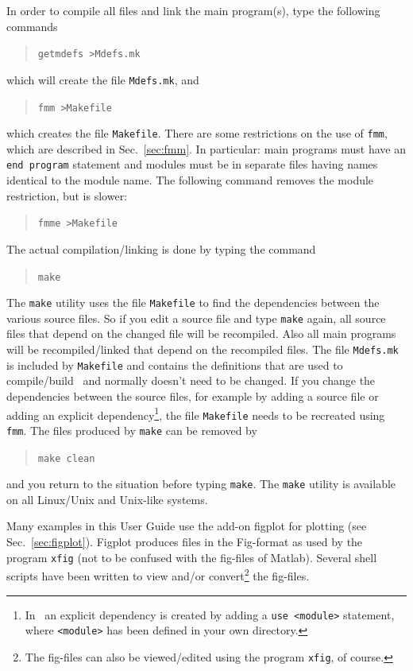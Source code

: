 In order to compile all files and link the main program(s), type the following
commands
\begin{quote}
   \texttt{getmdefs >Mdefs.mk}
\end{quote}
which will create the file \texttt{Mdefs.mk}, and
\begin{quote}
   \texttt{fmm >Makefile}
\end{quote}
which creates the file \texttt{Makefile}.
There are some restrictions on the use of
\texttt{fmm}, which are described in Sec.~\ref{sec:fmm}. In particular: main
programs must have an \texttt{end program} statement and modules
must be in separate files having names identical to the module name. The
following command removes the module restriction, but is slower:
\begin{quote}
   \texttt{fmme >Makefile}
\end{quote}
The actual compilation/linking is done by typing the command
\begin{quote}
   \texttt{make}
\end{quote}
The \texttt{make} utility uses the file \texttt{Makefile} to find the
dependencies between the various source files. So if you edit a source file 
and type \texttt{make} again, 
all source files that depend on the changed file
will be recompiled. Also all main programs
will be recompiled/linked that depend on the recompiled files. The file
\texttt{Mdefs.mk} is included by \texttt{Makefile} and
contains the definitions that are used to compile/build \tfem\ and normally
doesn't need to be changed. If you change the dependencies between the source
files, for example by adding a source file or adding an explicit
dependency\footnote{In \ftn\ an explicit dependency is created by 
adding a \texttt{use <module>} statement, where
\texttt{<module>} has been defined in your own directory.}, the
file \texttt{Makefile} needs to be recreated using \texttt{fmm}.
The files produced by \texttt{make} can be removed by
\begin{quote}
   \texttt{make clean}
\end{quote}
and you return to the situation before typing \texttt{make}.
The \texttt{make} utility is available on all Linux/Unix and Unix-like systems.

Many examples in this User Guide use the add-on figplot for plotting (see
Sec.~\ref{sec:figplot}). Figplot produces files in the Fig-format as
used by the program \texttt{xfig} (not to be confused with the fig-files of
Matlab). Several shell scripts have been written to view and/or
convert\footnote{The fig-files can also be viewed/edited using the program
\texttt{xfig}, of course.} the fig-files.

